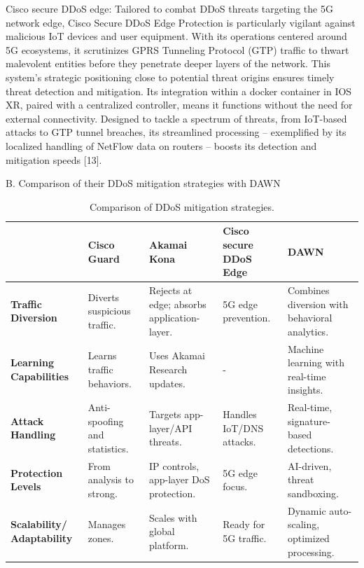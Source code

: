 \documentclass[conference]{IEEEtran}
\begin{document}
Cisco secure DDoS edge:
Tailored to combat DDoS threats targeting the 5G network edge, Cisco Secure DDoS Edge Protection is particularly vigilant against malicious IoT devices and user equipment. With its operations centered around 5G ecosystems, it scrutinizes GPRS Tunneling Protocol (GTP) traffic to thwart malevolent entities before they penetrate deeper layers of the network. This system's strategic positioning close to potential threat origins ensures timely threat detection and mitigation. Its integration within a docker container in IOS XR, paired with a centralized controller, means it functions without the need for external connectivity. Designed to tackle a spectrum of threats, from IoT-based attacks to GTP tunnel breaches, its streamlined processing – exemplified by its localized handling of NetFlow data on routers – boosts its detection and mitigation speeds [13].



B. Comparison of their DDoS mitigation strategies with DAWN
\begin{table}[h]
    \centering
    \small
    \begin{tabular}{|p{1.6cm}|p{1.2cm}|p{1.2cm}|p{1.2cm}|p{1.2cm}|}
        \hline
        & \textbf{Cisco Guard} & \textbf{Akamai Kona} & \textbf{Cisco secure DDoS Edge} & \textbf{DAWN} \\
        \hline
        \textbf{Traffic} \newline \textbf{Diversion} & Diverts suspicious traffic. & Rejects at edge; absorbs application-layer. & 5G edge prevention. & Combines diversion with behavioral analytics. \\
        \hline
        \textbf{Learning} \newline \textbf{Capabilities} & Learns traffic behaviors. & Uses Akamai Research updates. & - & Machine learning with real-time insights. \\
        \hline
        \textbf{Attack} \newline \textbf{Handling} & Anti-spoofing and statistics. & Targets app-layer/API threats. & Handles IoT/DNS attacks. & Real-time, signature-based detections. \\
        \hline
        \textbf{Protection} \newline \textbf{Levels} & From analysis to strong. & IP controls, app-layer DoS protection. & 5G edge focus. & AI-driven, threat sandboxing. \\
        \hline
        \textbf{Scalability/} \newline \textbf{Adaptability} & Manages zones. & Scales with global platform. & Ready for 5G traffic. & Dynamic auto-scaling, optimized processing. \\
        \hline
    \end{tabular}
    \caption{Comparison of DDoS mitigation strategies.}
    \label{tab:comparison}
\end{table}
\end{document}
